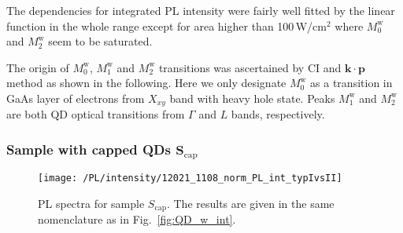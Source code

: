 The dependencies for integrated PL intensity were fairly well fitted by the linear function in the whole range except for area higher than 100$\,$W/cm$^2$ where $M_0^\mathrm{w}$ and $M_2^\mathrm{w}$ seem to be saturated.
		
The origin of $M_0^\mathrm{w}$, $M_1^\mathrm{w}$ and $M_2^\mathrm{w}$ transitions was ascertained by CI and $\mathbf{k \cdot p}$ method as shown in the following. Here we only designate $M_0^\mathrm{w}$ as a transition in GaAs layer of electrons from $X_{xy}$ band with heavy hole state. Peaks $M_1^\mathrm{w}$ and $M_2^\mathrm{w}$ are both QD optical transitions from $\Gamma$ and $L$ bands, respectively.



\subsubsection*{Sample with capped QDs $\mathbf{S_\mathrm{cap}}$}
\begin{figure}
	\centering
	\texttt{[image: /PL/intensity/12021\_1108\_norm\_PL\_int\_typIvsII]}
	\caption{PL spectra for sample $S_\mathrm{cap}$. The results are given in the same nomenclature as in Fig.~\ref{fig:QD_w_int}.}
	\label{fig:QD_cap_int}
\end{figure}

